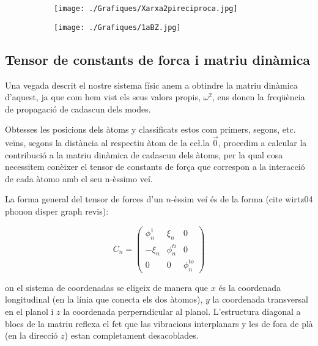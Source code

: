 \documentclass[12pt,twoside,a4paper, notitlepage]{article}%
\begin{document}
\begin{figure}[h]
\centering
\begin{subfigure}[b]{0.4\textwidth}
\texttt{[image: ./Grafiques/Xarxa2pireciproca.jpg]}
\end{subfigure}
\begin{subfigure}[b]{0.4\textwidth}
\texttt{[image: ./Grafiques/1aBZ.jpg]}
\end{subfigure}
\end{figure}





\subsection{Tensor de constants de forca i matriu dinàmica}

Una vegada descrit el nostre sistema físic anem a obtindre la matriu dinàmica d'aquest, ja que com hem vist els seus valors propis, $\omega^2$, ens donen la freqüència de propagació de cadascun dels modes.

Obtesses les posicions dels àtoms y classificats estos com primers, segons, etc. veïns, segons la distància al respectiu àtom de la ce\l.la $\vec 0$, procedim a calcular la contribució a la matriu dinàmica de cadascun dels àtoms, per la qual cosa necessitem conèixer el tensor de constants de for\c{c}a que correspon a la interacció de cada àtomo amb el seu n-èssimo veí.

La forma general del tensor de forces d'un $n$-èssim veí és de la forma (cite wirtz04 phonon disper graph revis): 


\begin{equation}
C_n=\begin{pmatrix}
\phi_n^1&\xi_n &0\\
-\xi_n & \phi_n^{ti} & 0 \\
0 & 0 & \phi_n^{to}
\end{pmatrix}
\label{eq:tensordeforces}
\end{equation}

on el sistema de coordenadas se eligeix de manera que $x$ és la coordenada longitudinal (en la línia que conecta els dos àtomos), $y$ la coordenada transversal en el planol i $z$ la coordenada perperndicular al planol. L'estructura diagonal a blocs de la matriu reflexa el fet que las vibracions interplanars y les de fora de plà (en la direcció $z$) estan completament desacoblades.
\end{document}
